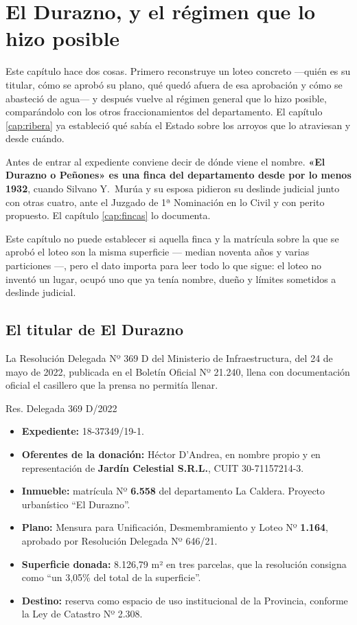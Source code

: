 \chapter{El Durazno, y el régimen que lo hizo posible}

\label{cap:loteo}
Este capítulo hace dos cosas. Primero reconstruye un loteo concreto —quién es su titular,
cómo se aprobó su plano, qué quedó afuera de esa aprobación y cómo se abasteció de agua— y
después vuelve al régimen general que lo hizo posible, comparándolo con los otros
fraccionamientos del departamento. El capítulo \ref{cap:ribera} ya estableció qué sabía el Estado
sobre los arroyos que lo atraviesan y desde cuándo.

\begin{cautela}
Antes de entrar al expediente conviene decir de dónde viene el nombre. \textbf{«El Durazno o
Peñones» es una finca del departamento desde por lo menos 1932}, cuando Silvano Y.\ Murúa y su esposa pidieron su deslinde judicial junto con otras cuatro, ante el Juzgado de 1ª
Nominación en lo Civil y con perito propuesto. El capítulo \ref{cap:fincas} lo documenta.

Este capítulo no puede establecer si aquella finca y la matrícula sobre la que se aprobó el
loteo son la misma superficie --- median noventa años y varias particiones ---, pero el dato
importa para leer todo lo que sigue: el loteo no inventó un lugar, ocupó uno que ya tenía
nombre, dueño y límites sometidos a deslinde judicial.
\end{cautela}

\section{El titular de El Durazno}

La Resolución Delegada Nº 369 D del Ministerio de Infraestructura, del 24 de mayo de 2022, publicada en el Boletín Oficial Nº 21.240, llena con documentación oficial el casillero que la prensa no permitía llenar.

\begin{ficha}{Res. Delegada 369 D/2022}
\begin{itemize}[leftmargin=*,nosep]
\item \textbf{Expediente:} 18-37349/19-1.
\item \textbf{Oferentes de la donación:} Héctor D'Andrea, en nombre propio y en representación de \textbf{Jardín Celestial S.R.L.}, CUIT 30-71157214-3.
\item \textbf{Inmueble:} matrícula Nº \textbf{6.558} del departamento La Caldera. Proyecto urbanístico ``El Durazno''.
\item \textbf{Plano:} Mensura para Unificación, Desmembramiento y Loteo Nº \textbf{1.164}, aprobado por Resolución Delegada Nº 646/21.
\item \textbf{Superficie donada:} 8.126,79 m² en tres parcelas, que la resolución consigna como ``un 3,05\% del total de la superficie''.
\item \textbf{Destino:} reserva como espacio de uso institucional de la Provincia, conforme la Ley de Catastro Nº 2.308.
\end{itemize}
\end{ficha}

